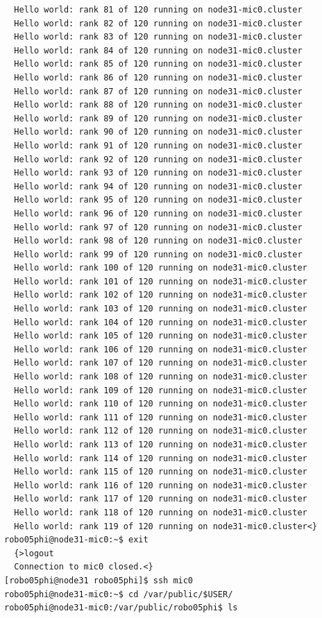 \documentclass[pscyr,10pt]{hedlab}
\begin{document}
\begin{lstlisting}
  Hello world: rank 81 of 120 running on node31-mic0.cluster
  Hello world: rank 82 of 120 running on node31-mic0.cluster
  Hello world: rank 83 of 120 running on node31-mic0.cluster
  Hello world: rank 84 of 120 running on node31-mic0.cluster
  Hello world: rank 85 of 120 running on node31-mic0.cluster
  Hello world: rank 86 of 120 running on node31-mic0.cluster
  Hello world: rank 87 of 120 running on node31-mic0.cluster
  Hello world: rank 88 of 120 running on node31-mic0.cluster
  Hello world: rank 89 of 120 running on node31-mic0.cluster
  Hello world: rank 90 of 120 running on node31-mic0.cluster
  Hello world: rank 91 of 120 running on node31-mic0.cluster
  Hello world: rank 92 of 120 running on node31-mic0.cluster
  Hello world: rank 93 of 120 running on node31-mic0.cluster
  Hello world: rank 94 of 120 running on node31-mic0.cluster
  Hello world: rank 95 of 120 running on node31-mic0.cluster
  Hello world: rank 96 of 120 running on node31-mic0.cluster
  Hello world: rank 97 of 120 running on node31-mic0.cluster
  Hello world: rank 98 of 120 running on node31-mic0.cluster
  Hello world: rank 99 of 120 running on node31-mic0.cluster
  Hello world: rank 100 of 120 running on node31-mic0.cluster
  Hello world: rank 101 of 120 running on node31-mic0.cluster
  Hello world: rank 102 of 120 running on node31-mic0.cluster
  Hello world: rank 103 of 120 running on node31-mic0.cluster
  Hello world: rank 104 of 120 running on node31-mic0.cluster
  Hello world: rank 105 of 120 running on node31-mic0.cluster
  Hello world: rank 106 of 120 running on node31-mic0.cluster
  Hello world: rank 107 of 120 running on node31-mic0.cluster
  Hello world: rank 108 of 120 running on node31-mic0.cluster
  Hello world: rank 109 of 120 running on node31-mic0.cluster
  Hello world: rank 110 of 120 running on node31-mic0.cluster
  Hello world: rank 111 of 120 running on node31-mic0.cluster
  Hello world: rank 112 of 120 running on node31-mic0.cluster
  Hello world: rank 113 of 120 running on node31-mic0.cluster
  Hello world: rank 114 of 120 running on node31-mic0.cluster
  Hello world: rank 115 of 120 running on node31-mic0.cluster
  Hello world: rank 116 of 120 running on node31-mic0.cluster
  Hello world: rank 117 of 120 running on node31-mic0.cluster
  Hello world: rank 118 of 120 running on node31-mic0.cluster
  Hello world: rank 119 of 120 running on node31-mic0.cluster<}
robo05phi@node31-mic0:~$ exit
  {>logout
  Connection to mic0 closed.<}
[robo05phi@node31 robo05phi]$ ssh mic0
robo05phi@node31-mic0:~$ cd /var/public/$USER/
robo05phi@node31-mic0:/var/public/robo05phi$ ls

\end{lstlisting}
\end{document}
